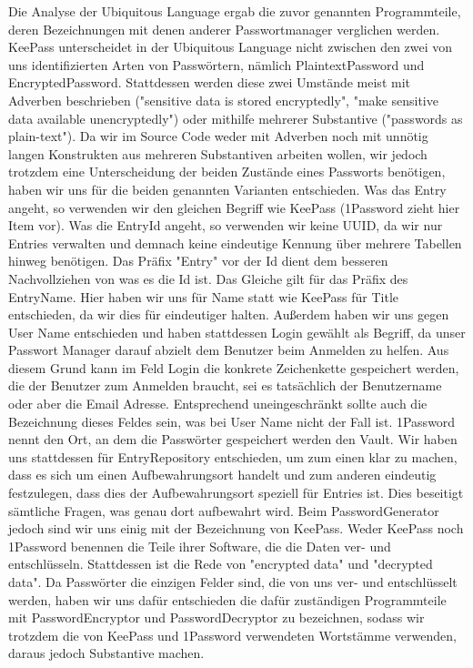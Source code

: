 Die Analyse der Ubiquitous Language ergab die zuvor genannten Programmteile, deren Bezeichnungen mit denen anderer Passwortmanager verglichen werden. KeePass unterscheidet in der Ubiquitous Language nicht zwischen den zwei von uns identifizierten Arten von Passwörtern, nämlich PlaintextPassword und EncryptedPassword. Stattdessen werden diese zwei Umstände meist mit Adverben beschrieben ("sensitive data is stored encryptedly", "make sensitive data available unencryptedly") oder mithilfe mehrerer Substantive ("passwords as plain-text"). Da wir im Source Code weder mit Adverben noch mit unnötig langen Konstrukten aus mehreren Substantiven arbeiten wollen, wir jedoch trotzdem eine Unterscheidung der beiden Zustände eines Passworts benötigen, haben wir uns für die beiden genannten Varianten entschieden. Was das Entry angeht, so verwenden wir den gleichen Begriff wie KeePass (1Password zieht hier Item vor). Was die EntryId angeht, so verwenden wir keine UUID, da wir nur Entries verwalten und demnach keine eindeutige Kennung über mehrere Tabellen hinweg benötigen. Das Präfix "Entry" vor der Id dient dem besseren Nachvollziehen von was es die Id ist. Das Gleiche gilt für das Präfix des EntryName. Hier haben wir uns für Name statt wie KeePass für Title entschieden, da wir dies für eindeutiger halten. Außerdem haben wir uns gegen User Name entschieden und haben stattdessen Login gewählt als Begriff, da unser Passwort Manager darauf abzielt dem Benutzer beim Anmelden zu helfen. Aus diesem Grund kann im Feld Login die konkrete Zeichenkette gespeichert werden, die der Benutzer zum Anmelden braucht, sei es tatsächlich der Benutzername oder aber die Email Adresse. Entsprechend uneingeschränkt sollte auch die Bezeichnung dieses Feldes sein, was bei User Name nicht der Fall ist. 1Password nennt den Ort, an dem die Passwörter gespeichert werden den Vault. Wir haben uns stattdessen für EntryRepository entschieden, um zum einen klar zu machen, dass es sich um einen Aufbewahrungsort handelt und zum anderen eindeutig festzulegen, dass dies der Aufbewahrungsort speziell für Entries ist. Dies beseitigt sämtliche Fragen, was genau dort aufbewahrt wird. Beim PasswordGenerator jedoch sind wir uns einig mit der Bezeichnung von KeePass. Weder KeePass noch 1Password benennen die Teile ihrer Software, die die Daten ver- und entschlüsseln. Stattdessen ist die Rede von "encrypted data" und "decrypted data". Da Passwörter die einzigen Felder sind, die von uns ver- und entschlüsselt werden, haben wir uns dafür entschieden die dafür zuständigen Programmteile mit PasswordEncryptor und PasswordDecryptor zu bezeichnen, sodass wir trotzdem die von KeePass und 1Password verwendeten Wortstämme verwenden, daraus jedoch Substantive machen.  


